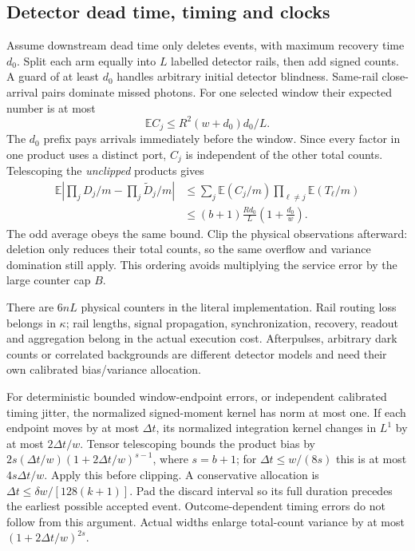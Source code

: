 \documentclass[11pt]{article}
\begin{document}
\subsection{Detector dead time, timing and clocks}
Assume downstream dead time only deletes events, with maximum recovery time \(d_0\). Split each arm equally into \(L\) labelled detector rails, then add signed counts. A guard of at least \(d_0\) handles arbitrary initial detector blindness. Same-rail close-arrival pairs dominate missed photons. For one selected window their expected number is at most
\[
 \mathbb EC_j\le R^2(w+d_0)d_0/L.
\]
The \(d_0\) prefix pays arrivals immediately before the window. Since every factor in one product uses a distinct port, \(C_j\) is independent of the other total counts. Telescoping the \emph{unclipped} products gives
\begin{align*}
 \mathbb E\left|\prod_jD_j/m-\prod_j\widetilde D_j/m\right|
 &\le\sum_j\mathbb E(C_j/m)\prod_{\ell\ne j}\mathbb E(T_\ell/m)\\
 &\le (b+1)\frac{Rd_0}{L}\left(1+\frac{d_0}{w}\right).
\end{align*}
The odd average obeys the same bound. Clip the physical observations afterward: deletion only reduces their total counts, so the same overflow and variance domination still apply. This ordering avoids multiplying the service error by the large counter cap \(B\).

There are \(6nL\) physical counters in the literal implementation. Rail routing loss belongs in \(\kappa\); rail lengths, signal propagation, synchronization, recovery, readout and aggregation belong in the actual execution cost. Afterpulses, arbitrary dark counts or correlated backgrounds are different detector models and need their own calibrated bias/variance allocation.

For deterministic bounded window-endpoint errors, or independent calibrated timing jitter, the normalized signed-moment kernel has norm at most one. If each endpoint moves by at most \(\Delta t\), its normalized integration kernel changes in \(L^1\) by at most \(2\Delta t/w\). Tensor telescoping bounds the product bias by \(2s(\Delta t/w)(1+2\Delta t/w)^{s-1}\), where \(s=b+1\); for \(\Delta t\le w/(8s)\) this is at most \(4s\Delta t/w\). Apply this before clipping. A conservative allocation is \(\Delta t\le\delta w/[128(k+1)]\). Pad the discard interval so its full duration precedes the earliest possible accepted event. Outcome-dependent timing errors do not follow from this argument. Actual widths enlarge total-count variance by at most \((1+2\Delta t/w)^{2s}\).
\end{document}
